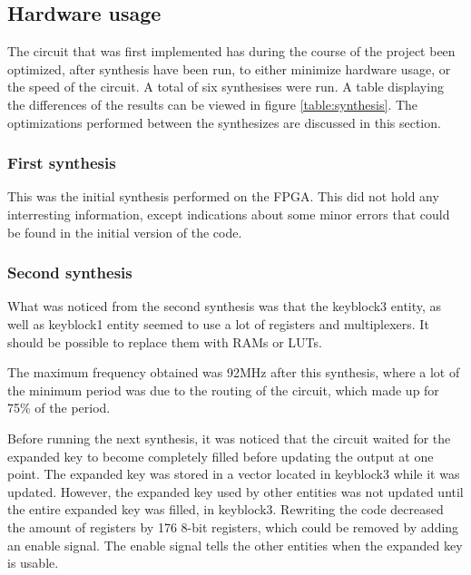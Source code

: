 \subsection{Hardware usage}
The circuit that was first implemented has during the course of the 
project been optimized, after synthesis have been run, to either 
minimize hardware usage, or the speed of the circuit. A total of six 
synthesises were run. A table displaying the differences of the results 
can be viewed in figure \ref{table:synthesis}.
The optimizations performed between the synthesizes are discussed in 
this section.

\subsubsection{First synthesis}
This was the initial synthesis performed on the FPGA. This did not hold 
any interresting information, except indications about some minor 
errors that could be found in the initial version of the code.

\subsubsection{Second synthesis}
What was noticed from the second synthesis was that the keyblock3 
entity, as well as keyblock1 entity seemed to use a lot of registers 
and multiplexers. It should be possible to replace them with RAMs or 
LUTs.

The maximum frequency obtained was 92MHz after this synthesis, where a 
lot of the minimum period was due to the routing of the circuit, which 
made up for 75\% of the period.

Before running the next synthesis, it was noticed that the circuit 
waited for the expanded key to become completely filled before updating 
the output at one point. The expanded key was stored in a vector 
located in keyblock3 while it was updated. However, the expanded key 
used by other entities was not updated until the entire expanded key 
was filled, in keyblock3. Rewriting the code decreased the amount of 
registers by 176 8-bit registers, which could be removed by adding an 
enable signal. The enable signal tells the other entities when the 
expanded key is usable.

